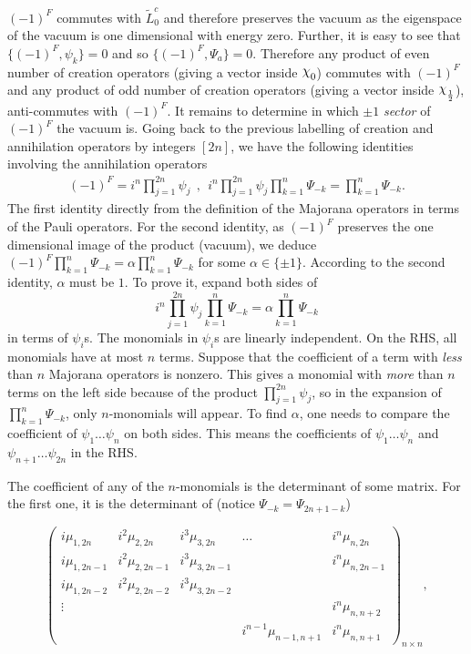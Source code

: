 \documentclass[twoside,11pt,titlepage]{amsart}
\renewcommand{\=}[1]{\stackrel{#1}{=}} %
\theoremstyle{definition}
\theoremstyle{remark}
\DeclareRobustCommand{\rchi}{{\mathpalette\irchi\relax}}
\newcommand{\irchi}[2]{\raisebox{\depth}{$#1\chi$}}
\begin{document}
$(-1)^F$ commutes with $\widetilde{L}_0^c$ and therefore preserves the vacuum as the eigenspace of the vacuum is one dimensional with energy zero. Further, it is easy to see that $\{(-1)^F,\psi_k\}=0$ and so $\{(-1)^F,\Psi_a\}=0$. Therefore any product of even number of creation operators (giving a vector inside $\rchi_0$) commutes with $(-1)^F$ and any product of odd number of creation operators (giving a vector inside $\rchi_\frac{1}{2}$), anti-commutes with $(-1)^F$. It remains to determine 
in which $\pm 1$ \textit{sector} of $(-1)^F$ the vacuum is. Going back to the previous labelling of creation and annihilation operators by integers $[2n]$, we have the following identities involving the annihilation operators
\begin{align}\label{eq19}
(-1)^F=i^n\prod_{j=1}^{2n} \psi_j\ \ , \ \ i^n \prod_{j=1}^{2n} \psi_j \prod_{k=1}^n \Psi_{-k}=\prod_{k=1}^n \Psi_{-k} .
\end{align}
The first identity  directly from the definition of the Majorana operators in terms of the Pauli operators. 
For the second identity, as $(-1)^F$ preserves the one dimensional image of the product (vacuum), we deduce $(-1)^F \prod_{k=1}^n \Psi_{-k}= \alpha \prod_{k=1}^n \Psi_{-k}$ for some $\alpha \in \{\pm 1\}$. According to the second identity, $\alpha$ must be $1$. To prove it, expand both sides of 
$$i^n \prod_{j=1}^{2n} \psi_j \prod_{k=1}^n \Psi_{-k}= \alpha \prod_{k=1}^n \Psi_{-k}$$
in terms of $\psi_i$s. The monomials in $\psi_i$s are linearly independent. On the RHS, all monomials have at most $n$ terms. Suppose that the coefficient of a term with \textit{less} than $n$ Majorana operators is nonzero. This gives a monomial with \textit{more} than $n$ terms on the left side because of the product $\prod_{j=1}^{2n} \psi_j$, so in the expansion of $\prod_{k=1}^n \Psi_{-k}$, only $n$-monomials will appear. To find $\alpha$, one needs to compare the coefficient of $\psi_1 \ldots \psi_n$ on both sides. This means the coefficients of $\psi_1\ldots \psi_n$ and $\psi_{n+1}\ldots\psi_{2n}$ in the RHS. 

The coefficient of any of the $n$-monomials is the determinant of some matrix. For the first one, it is the determinant of (notice $\Psi_{-k}=\Psi_{2n+1-k}$)

$$\begin{pmatrix}
         i\mu_{1,2n} & i^2 \mu_{2,2n} & i^3 \mu_{3,2n} & \ldots & i^n\mu_{n,2n} \\
         i\mu_{1,2n-1} & i^2 \mu_{2,2n-1} & i^3 \mu_{3,2n-1} & & i^n\mu_{n,2n-1} \\
         i\mu_{1,2n-2} & i^2 \mu_{2,2n-2} & i^3 \mu_{3,2n-2} & &   \\
         \vdots &  &  & & i^n\mu_{n,n+2} \\
         &  & & i^{n-1}\mu_{n-1,n+1} &  i^{n}\mu_{n,n+1}
\end{pmatrix}_{n \times n},$$
\end{document}
